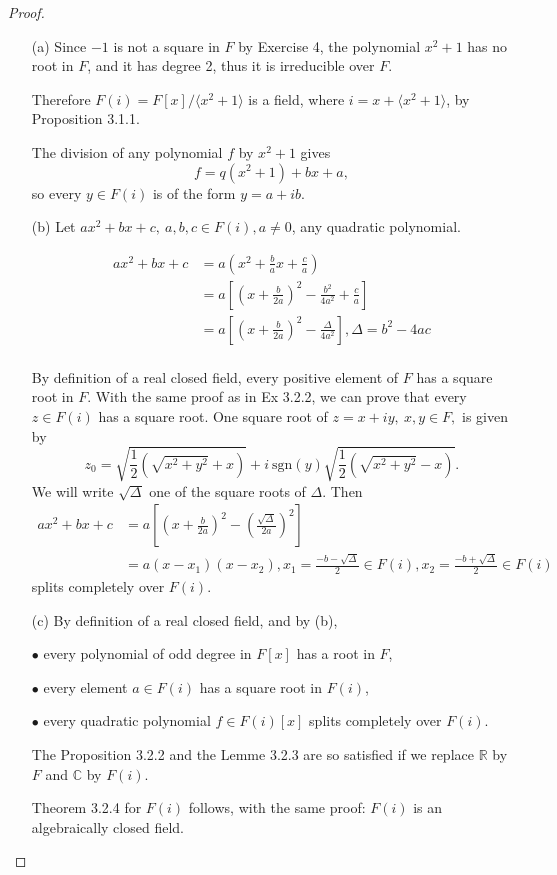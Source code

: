 \documentclass[11pt,a4paper]{article}
\newcommand{\R}{\mathbb{R}}
\newcommand{\C}{\mathbb{C}}
\begin{document}
\begin{proof}
\begin{enumerate}
\item[(a)]
Since $-1$ is not a square in $F$ by Exercise 4, the polynomial $x^2+1$ has no root in $F$, and it has degree 2, thus it is irreducible over $F$.

Therefore $F(i) = F[x]/\langle x^2+1\rangle$ is a field, where $i = x + \langle x^2 + 1 \rangle$, by Proposition 3.1.1.

The division of any polynomial $f$ by $x^2+1$ gives $$f= q (x^2+1) + bx+a,$$ so every $y \in F(i)$ is of the form $y = a+ ib$.

 \item[(b)] Let $ax^2+bx+c,\  a,b,c \in F(i), a\neq 0$, any quadratic polynomial.
 
 \begin{align*}
 a x^2+bx+c &= a\left(x^2+ \frac{b}{a}x + \frac{c}{a}\right)\\
 &=a\left[\left(x+\frac{b}{2a}\right)^2 -\frac{b^2}{4a^2} + \frac{c}{a}\right]\\
 &=a\left[\left(x+\frac{b}{2a}\right)^2 -\frac{\Delta}{4a^2}\right] , \Delta = b^2-4ac\\
 \end{align*}
 
By definition of a real closed field, every positive element of $F$ has a square root in $F$. With the same proof as in Ex 3.2.2, we can prove that every $z \in F(i)$ has a square root. One square root of $z = x + iy,\  x,y \in F,$ is given by 
$$z_0 = \sqrt{\frac{1}{2}\left ( \sqrt{x^2+y^2}  + x\right)} + i \ \mathrm{sgn}(y)\sqrt{\frac{1}{2}\left( \sqrt{x^2+y^2} -x\right)}.$$
We will write $\sqrt{\Delta}$ one of the square roots of $\Delta$. Then
 \begin{align*}
 ax^2+bx+c &= a\left[\left(x+\frac{b}{2a}\right)^2 -\left (\frac{\sqrt{\Delta}}{2a}\right)^2\right]\\
 &=a(x-x_1)(x-x_2), x_1 = \frac{-b-\sqrt{\Delta}}{2} \in F(i), x_2 = \frac{-b+\sqrt{\Delta}}{2} \in F(i)
 \end{align*}
 splits completely over $F(i)$.
  
 \item[(c)]
By definition of a real closed field, and by (b),
 
 $\bullet$ every  polynomial of odd degree in $F[x]$ has a root in $F$,
 
 $\bullet$ every element $a \in F(i)$ has a square root in $F(i)$,
 
 $\bullet$ every quadratic polynomial  $f \in F(i)[x] $ splits completely over $F(i)$.
 
The Proposition 3.2.2 and the Lemme 3.2.3 are so satisfied if we replace $\R$ by $F$ and $\C$ by $F(i)$.
 
Theorem 3.2.4 for $F(i)$ follows, with the same proof: $F(i)$ is an algebraically closed field.
\end{enumerate}
\end{proof}
\end{document}
